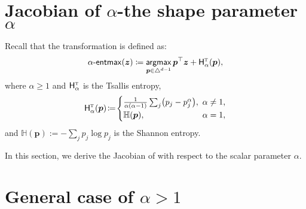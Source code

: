 \def\RR{{\mathbb{R}}}
\def\EE{{\mathbb{E}}}
\def\RRY{\RR^{|\cY|}}
\def\y{\bm{y}}
\def\triangleY{\triangle^{|\cY|}}
\def\sizeY{{|\cY|}}
\def\cC{{\mathcal{C}}}
\def\cD{{\mathcal{D}}}
\def\cX{{\mathcal{X}}}
\def\cY{{\mathcal{Y}}}

\label{app:fenchelyoung}

\cleardoublepage
\doublespacing

\section*{Jacobian of {\boldmath $\alpha$}-\entmaxtext \wrt the shape parameter
      {\boldmath $\alpha$}}
\label{app:alpha_grad}

\noindent Recall that the \entmaxtext transformation is defined as:
\begin{equation}\label{eq:entmax_form_supp}
    \mathop{\mathsf{\alpha}\textnormal{-}\mathsf{entmax}}(\bm{z}) \coloneqq
    \operatorname*{\mathsf{argmax}}_{\bm{p} \in \triangle^{d-1}} \bm{p}^\top\bm{z} + \mathsf{H}^{{\textsc{t}}}_{\alpha}(\bm{p}),
\end{equation}
where $\alpha \geq 1$ and $\mathsf{H}^{{\textsc{t}}}_{\alpha}$ is the Tsallis entropy,
\begin{equation}%
    \HHt_{\alpha}(\bm{p})\!\coloneqq\!
    \begin{cases}
        \frac{1}{\alpha(\alpha-1)}\sum_j\!\left(p_j - p_j^\alpha\right)\!, &
        \!\!\!\alpha \ne 1,                                                  \\
        \mathbb H(\bm{p}),                                                 &
        \!\!\!\alpha = 1,
    \end{cases}
\end{equation}
and $\mathbb H(\bm{p}):= -\sum_j p_j \log p_j$ is the Shannon entropy.

In this section, we derive the Jacobian of \entmaxtext with respect to the scalar parameter $\alpha$.

\section*{General case of {\boldmath $\alpha>1$}}

